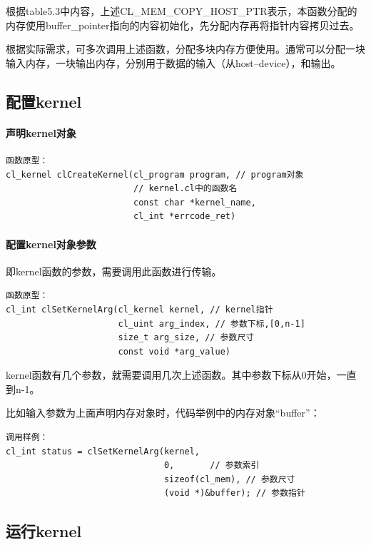 \documentclass{ctexart}
\begin{document}
根据table5.3中内容，上述CL\_MEM\_COPY\_HOST\_PTR表示，本函数分配的内存使用buffer\_pointer指向的内容初始化，先分配内存再将指针内容拷贝过去。

根据实际需求，可多次调用上述函数，分配多块内存方便使用。通常可以分配一块输入内存，一块输出内存，分别用于数据的输入（从host--device），和输出。

\subsection{配置kernel}

\paragraph{声明kernel对象}
\begin{verbatim}
函数原型：
cl_kernel clCreateKernel(cl_program program, // program对象
                         // kernel.cl中的函数名
                         const char *kernel_name,
                         cl_int *errcode_ret)
\end{verbatim}


\paragraph{配置kernel对象参数}
即kernel函数的参数，需要调用此函数进行传输。
\begin{verbatim}
函数原型：
cl_int clSetKernelArg(cl_kernel kernel, // kernel指针
                      cl_uint arg_index, // 参数下标,[0,n-1]
                      size_t arg_size, // 参数尺寸
                      const void *arg_value)
\end{verbatim}

kernel函数有几个参数，就需要调用几次上述函数。其中参数下标从0开始，一直到n-1。

比如输入参数为上面声明内存对象时，代码举例中的内存对象“buffer”：
\begin{verbatim}
调用样例：
cl_int status = clSetKernelArg(kernel,
                        	   0,		// 参数索引
                        	   sizeof(cl_mem), // 参数尺寸
                        	   (void *)&buffer); // 参数指针
\end{verbatim}


\subsection{运行kernel}
\end{document}
